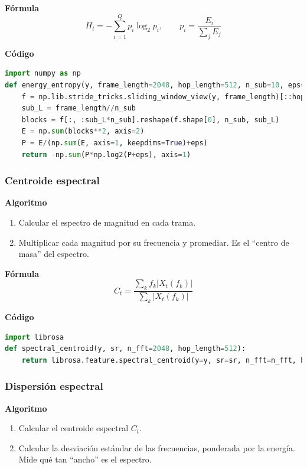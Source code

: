 \textbf{Fórmula}
\[
  H_t=-\sum_{i=1}^{Q}p_i\log_2 p_i,\qquad p_i=\frac{E_i}{\sum_j E_j}
\]

\textbf{Código}
\begin{lstlisting}[language=Python, label={lst:entropy_energy_code}, caption={Entropía de energía}]
import numpy as np
def energy_entropy(y, frame_length=2048, hop_length=512, n_sub=10, eps=1e-10):
    f = np.lib.stride_tricks.sliding_window_view(y, frame_length)[::hop_length]
    sub_L = frame_length//n_sub
    blocks = f[:, :sub_L*n_sub].reshape(f.shape[0], n_sub, sub_L)
    E = np.sum(blocks**2, axis=2)
    P = E/(np.sum(E, axis=1, keepdims=True)+eps)
    return -np.sum(P*np.log2(P+eps), axis=1)
\end{lstlisting}

\subsubsection{Centroide espectral}
\textbf{Algoritmo} \parencite{tzanetakis2002musical, muller2015fmp}
\begin{enumerate}
  \item Calcular el espectro de magnitud en cada trama.
  \item Multiplicar cada magnitud por su frecuencia y promediar. Es el “centro de masa” del espectro.
\end{enumerate}

\textbf{Fórmula}
\[
  C_t=\frac{\sum_{k} f_k |X_t(f_k)|}{\sum_{k}|X_t(f_k)|}
\]

\textbf{Código}
\begin{lstlisting}[language=Python, label={lst:centroid_code}, caption={Centroide espectral}]
import librosa
def spectral_centroid(y, sr, n_fft=2048, hop_length=512):
    return librosa.feature.spectral_centroid(y=y, sr=sr, n_fft=n_fft, hop_length=hop_length)[0]
\end{lstlisting}

\subsubsection{Dispersión espectral}
\textbf{Algoritmo} \parencite{tzanetakis2002musical, peeters2004large}
\begin{enumerate}
  \item Calcular el centroide espectral \(C_t\).
  \item Calcular la desviación estándar de las frecuencias, ponderada por la energía. Mide qué tan “ancho” es el espectro.
\end{enumerate}

